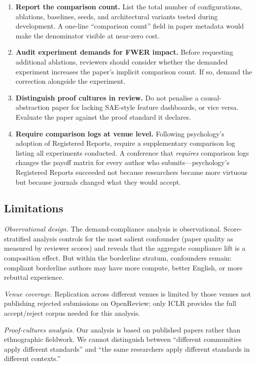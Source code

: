 \documentclass{article}
\begin{document}
\begin{enumerate}[leftmargin=*]
\item \textbf{Report the comparison count.} List the total number of configurations, ablations, baselines, seeds, and architectural variants tested during development. A one-line ``comparison count'' field in paper metadata would make the denominator visible at near-zero cost.
\item \textbf{Audit experiment demands for FWER impact.} Before requesting additional ablations, reviewers should consider whether the demanded experiment increases the paper's implicit comparison count. If so, demand the correction alongside the experiment.
\item \textbf{Distinguish proof cultures in review.} Do not penalise a causal-abstraction paper for lacking SAE-style feature dashboards, or vice versa. Evaluate the paper against the proof standard it declares.
\item \textbf{Require comparison logs at venue level.} Following psychology's adoption of Registered Reports, require a supplementary comparison log listing all experiments conducted. A conference that \textit{requires} comparison logs changes the payoff matrix for every author who submits---psychology's Registered Reports succeeded not because researchers became more virtuous but because journals changed what they would accept.
\end{enumerate}

\subsection{Limitations}
\label{sec:limitations}

\textit{Observational design.} The demand-compliance analysis is observational. Score-stratified analysis controls for the most salient confounder (paper quality as measured by reviewer scores) and reveals that the aggregate compliance lift is a composition effect. But within the borderline stratum, confounders remain: compliant borderline authors may have more compute, better English, or more rebuttal experience.

\textit{Venue coverage.} Replication across different venues is limited by those venues not publishing rejected submissions on OpenReview; only ICLR provides the full accept/reject corpus needed for this analysis.

\textit{Proof-cultures analysis.} Our analysis is based on published papers rather than ethnographic fieldwork. We cannot distinguish between ``different communities apply different standards'' and ``the same researchers apply different standards in different contexts.''
\end{document}
